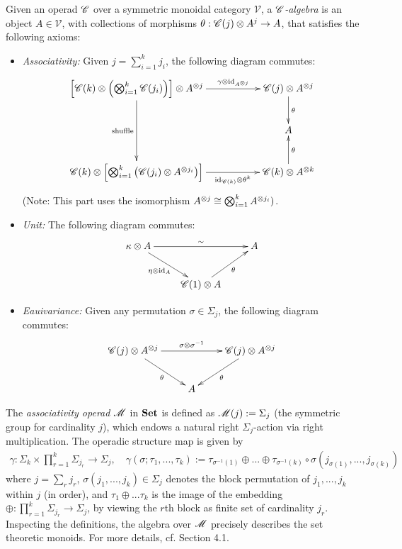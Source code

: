 \documentclass{article}
\begin{document}
\begin{defn}\label{defn_operad_alg}
    Given an operad $\mathscr{C}$ over a symmetric monoidal category $\mathcal{V}$, a \emph{$\mathscr{C}$-algebra} is an object $A\in\mathcal{V}$, with collections of morphisms $\theta:\mathscr{C}(j)\otimes A^j\rightarrow A$, that satisfies the following axioms:
    \begin{itemize}
        \item \emph{Associativity:} Given $j = \sum_{i=1}^k j_i$, the following diagram commutes:
        \[\xymatrix{
            \left[\C(k)\tensor \left(\bigtensor_{i=1}^k \C(j_i)\right)\right] \tensor A^{\tensor j} \ar[dd]_-{\text{shuffle}} \ar[rr]^-{\gamma\tensor \id_{A^{\tensor j}}} && \C(j)\tensor A^{\tensor j} \ar[d]^-{\theta}\\
            & & A\\
            \C(k)\tensor \left[\bigtensor_{i=1}^k \left(\C(j_i)\tensor A^{\tensor j_i}\right)\right] \ar[rr]_-{\id_{\C(k)}\tensor \theta^k} && \C(k)\tensor A^{\tensor k} \ar[u]_-{\theta}
        }\]
        (Note: This part uses the isomorphism $A^{\otimes j}\cong\bigotimes_{i=1}^k A^{\otimes j_i})$.
        \item \emph{Unit:} The following diagram commutes:
        \[\xymatrix{
            \kappa \tensor A \ar[dr]_-{\eta\tensor \id_A} \ar[rr]^-{\sim} && A\\
            & \C(1)\tensor A \ar[ur]_-{\theta}
        }\]
        \item \emph{Eauivariance:} Given any permutation $\sigma\in\Sigma_j$, the following diagram commutes:
        \[\xymatrix{
            \C(j)\tensor A^{\tensor j} \ar[dr]_-{\theta} \ar[rr]^-{\sigma\tensor \sigma^{-1}} && \C(j)\tensor A^{\tensor j} \ar[dl]^-{\theta}\\
            & A
        }\]
    \end{itemize}
\end{defn}

\begin{exmp}
    The \emph{associativity operad} $\mathscr{M}$ in $\mathbf{Set}$ is defined as $\mathscr{M}(j):=\Sigma_j$ (the symmetric group for cardinality $j$), which endows a natural right $\Sigma_j$-action via right multiplication. The operadic structure map is given by 
    \begin{align}
        \gamma:\Sigma_k\times\prod_{r=1}^k\Sigma_{j_r}\rightarrow\Sigma_j,\quad \gamma(\sigma;\tau_1,...,\tau_k):= \tau_{\sigma^{-1}(1)}\oplus...\oplus\tau_{\sigma^{-1}(k)}\circ \sigma(j_{\sigma(1)},...,j_{\sigma(k)})
    \end{align}
    where $j=\sum_r j_r$, $\sigma(j_1,...,j_k)\in \Sigma_j$ denotes the block permutation of $j_1,...,j_k$ within $j$ (in order), and $\tau_1\oplus ... \tau_{k}$ is the image of the embedding $\oplus:\prod_{r=1}^k\Sigma_{j_r}\rightarrow\Sigma_j$, by viewing the $r$th block as finite set of cardinality $j_r$. Inspecting the definitions, the algebra over $\mathscr{M}$ precisely describes the set theoretic monoids. For more details, cf.  \cite{GM17} Section 4.1.
\end{exmp}
\end{document}
